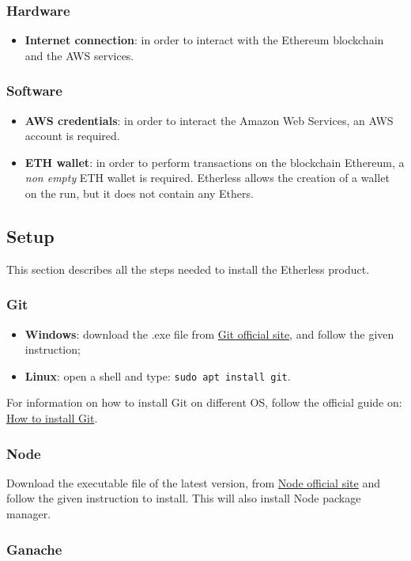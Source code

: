 \subsubsection{Hardware}
\begin{itemize}
	\item \textbf{Internet connection}: in order to interact with the Ethereum blockchain and the AWS services.
\end{itemize}
\subsubsection{Software}
\begin{itemize}
	\item \textbf{AWS credentials}: in order to interact the Amazon Web Services, an AWS account is required.
	\item \textbf{ETH wallet}: in order to perform transactions on the blockchain Ethereum, a \textit{non empty} ETH wallet is required. Etherless allows the creation of a wallet on the run, but it does not contain any Ethers.
\end{itemize}
\subsection{Setup}
This section describes all the steps needed to install the Etherless product. 
\subsubsection{Git}
\begin{itemize}
	\item \textbf{Windows}: download the .exe file from \href{https://git-scm.com/download/win}{Git official site}, and follow the given instruction;
	\item \textbf{Linux}: open a shell and type: \texttt{sudo apt install git}.
\end{itemize}
	For information on how to install Git on different OS, follow the official guide on: \href{https://git-scm.com/book/en/v2/Getting-Started-Installing-Git}{How to install Git}.
\subsubsection{Node}
	Download the executable file of the latest version, from \href{https://nodejs.org/it/download/}{Node official site} and follow the given instruction to install. This will also install Node package manager.
\subsubsection{Ganache}

